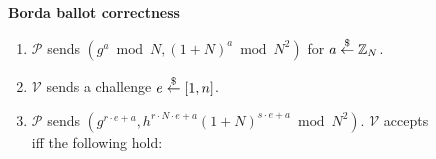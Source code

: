 \begin{figure}[htb]
    \centering
    \begin{mdframed}
    \begin{center}
        \textbf{Borda ballot correctness}
    \end{center}
    \begin{enumerate}
       \item $\mathcal{P}$ sends $(g^a\bmod{N},(1+N)^{a}\bmod{N^2})$ for $a\stackrel{\$}{\gets}\mathbb{Z}_N$. 
       \item $\mathcal{V}$ sends a challenge $e\stackrel{\$}{\gets}[1,n]$.  
       \item $\mathcal{P}$ sends $(g^{r\cdot e+a},h^{r\cdot N\cdot e+a}(1+N)^{s\cdot e+a}\bmod{N^2})$.
    $\mathcal{V}$ accepts iff the following hold:
    \end{enumerate}
    \end{mdframed}
    \label{fig:borda-pok}
\end{figure}
